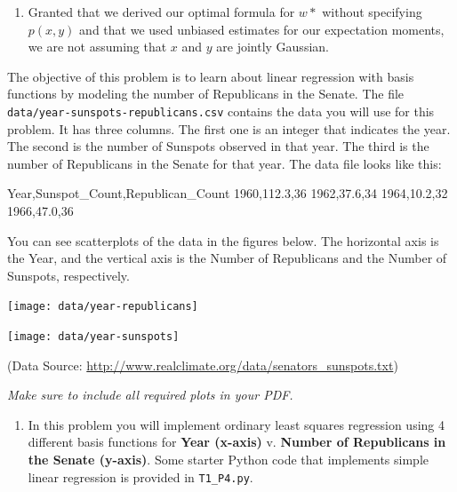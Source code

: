 \documentclass[submit]{harvardml}
\begin{document}
\begin{enumerate}
    \item Granted that we derived our optimal formula for $w*$ without specifying $p(x,y)$ and that we used unbiased estimates for our expectation moments,  we are not assuming that $x$ and $y$ are jointly Gaussian.
\end{enumerate}


\begin{problem}
  
 The objective of this problem is to learn about linear regression
 with basis functions by modeling the number of Republicans in the
 Senate. The file \verb|data/year-sunspots-republicans.csv| contains the
 data you will use for this problem.  It has three columns.  The first
 one is an integer that indicates the year.  The second is the number
 of Sunspots observed in that year.  The third is the number of Republicans in the Senate for that year.
 The data file looks like this:
 \begin{csv}
Year,Sunspot_Count,Republican_Count
1960,112.3,36
1962,37.6,34
1964,10.2,32
1966,47.0,36
\end{csv}

You can see scatterplots of the data in the figures below.  The horizontal axis is the Year, and the vertical axis is the Number of Republicans and the Number of Sunspots, respectively.

\begin{center}
\texttt{[image: data/year-republicans]}
\end{center}

\begin{center}
\texttt{[image: data/year-sunspots]}
\end{center}

(Data Source: \url{http://www.realclimate.org/data/senators_sunspots.txt})\\
\vspace{-5mm}


\vspace{0.5cm}
\noindent\emph{Make sure to include all required plots in your PDF.}

\begin{enumerate}

\item In this problem you will implement ordinary least squares
  regression using 4 different basis functions for \textbf{Year
    (x-axis)} v. \textbf{Number of Republicans in the Senate
    (y-axis)}. Some starter Python code that implements simple linear
  regression is provided in \verb|T1_P4.py|.


\end{enumerate}
\end{problem}
\end{document}
